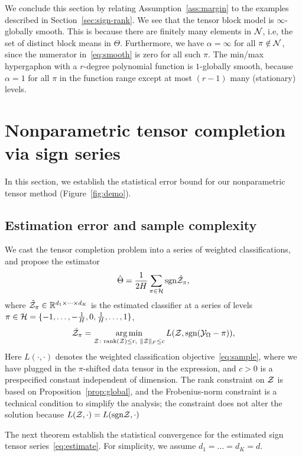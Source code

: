 \documentclass{article}
\theoremstyle{plain}
\theoremstyle{definition}
\def\sign{\textup{sgn}}
\begin{document}
We conclude this section by relating Assumption~\ref{ass:margin} to the examples described in Section~\ref{sec:sign-rank}. 
We see that the tensor block model is $\infty$-globally smooth. This is because there are finitely many elements in $\mathcal{N}$, i.e, the set of distinct block means in $\Theta$. Furthermore, we have $\alpha= \infty$ for all $\pi \notin \mathcal{N}$, since the numerator in~\eqref{eq:smooth} is zero for all such $\pi$. The min/max hypergaphon with a $r$-degree polynomial function is $1$-globally smooth, because $\alpha=1$ for all $\pi$ in the function range except at most $(r-1)$ many (stationary) levels. 




\section{Nonparametric tensor completion via sign series}\label{sec:estimation}
In this section, we establish the statistical error bound for our nonparametric tensor method (Figure~\ref{fig:demo}). 

\subsection{Estimation error and sample complexity}
We cast the tensor completion problem into a series of weighted classifications, and propose the estimator
\begin{equation}\label{eq:est}
\hat \Theta = {1\over 2H}\sum_{\pi \in \tH}\sign{\hat \tZ_\pi},
\end{equation}
where $\hat {\mathcal{Z}}_\pi\in\mathbb{R}^{d_1\times \dots\times d_K}$ is the estimated classifier at a series of levels $\pi \in \mathcal{H}=\{-1,\ldots,-{1\over H}, 0, {1\over H},\ldots,1\}$,
\begin{equation}\label{eq:estimate}
\hat \tZ_\pi = \argmin_{\tZ\colon \text{rank}(\tZ)\leq r, \ \FnormSize{}{\tZ}\leq c} L(\tZ, \sign(\tY_\Omega-\pi)),
\end{equation}
Here $L(\cdot,\cdot)$ denotes the weighted classification objective~\eqref{eq:sample}, where we have plugged in the $\pi$-shifted data tensor in the expression, and $c>0$ is a prespecified constant independent of dimension. The rank constraint on $\mathcal{Z}$ is based on Proposition~\ref{prop:global}, and the Frobenius-norm constraint is a technical condition to simplify the analysis; the constraint does not alter the solution because $L(\tZ,\cdot)=L(\sign \tZ,\cdot)$ 

The next theorem establish the statistical convergence for the estimated sign tensor series~\eqref{eq:estimate}. For simplicity, we assume $d_1=\ldots=d_K=d$.
\end{document}
